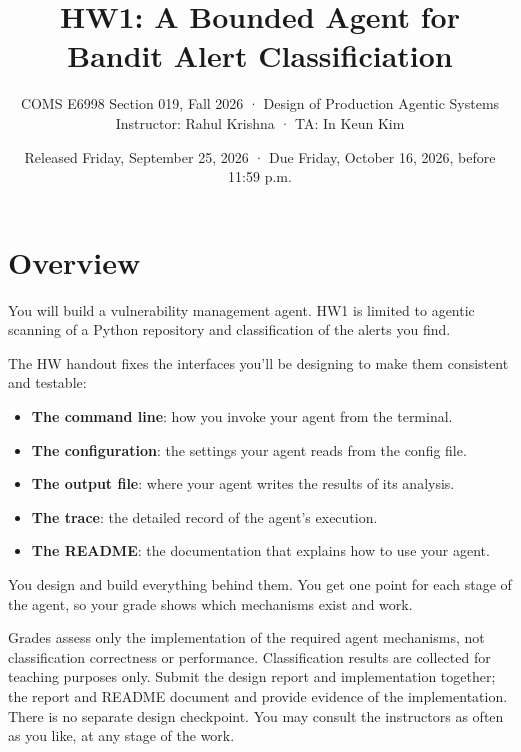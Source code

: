 \documentclass[9pt,letterpaper]{article}
\title{HW1: A Bounded Agent for Bandit Alert Classificiation}
\author{COMS E6998 Section 019, Fall 2026 · Design of Production Agentic Systems\\
  Instructor: Rahul Krishna · TA: In Keun Kim}
\date{Released Friday, September 25, 2026 · Due Friday, October 16, 2026, before 11:59 p.m.}
\begin{document}
\makeatletter\markeverypar{\the\everypar}\makeatother
\maketitle

\newcommand\code[1]{\texttt{\detokenize{#1}}}
\newcommand\file{\nolinkurl}

\section{Overview}

You will build a vulnerability management agent. HW1 is limited to agentic
scanning of a Python repository and classification of the alerts you find. 

The HW handout fixes the interfaces you'll be designing to make them consistent and testable:
\begin{itemize}
\item \textbf{The command line}: how you invoke your agent from the terminal.
\item \textbf{The configuration}: the settings your agent reads from the config file.
\item \textbf{The output file}: where your agent writes the results of its analysis.
\item \textbf{The trace}: the detailed record of the agent's execution.
\item \textbf{The README}: the documentation that explains how to use your agent.
\end{itemize}

You design and build everything behind them. You get one point for 
each stage of the agent, so your grade shows which mechanisms exist and work.

Grades assess only the implementation of the required agent mechanisms, not
classification correctness or performance. Classification results are collected
for teaching purposes only. Submit the design report and implementation together;
the report and README document and provide evidence of the implementation.
There is no separate design checkpoint. You may consult the instructors as often
as you like, at any stage of the work.
\end{document}
